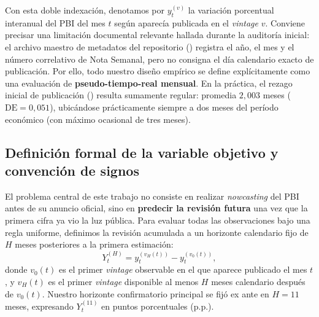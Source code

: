 \documentclass[12pt,letterpaper]{article}
\begin{document}
Con esta doble indexación, denotamos por \(y_t^{(v)}\) la variación porcentual interanual del PBI del mes \(t\) según aparecía publicada en el \emph{vintage} \(v\). Conviene precisar una limitación documental relevante hallada durante la auditoría inicial: el archivo maestro de metadatos del repositorio () registra el año, el mes y el número correlativo de Nota Semanal, pero no consigna el día calendario exacto de publicación. Por ello, todo nuestro diseño empírico se define explícitamente como una evaluación de \textbf{pseudo-tiempo-real mensual}. En la práctica, el rezago inicial de publicación () resulta sumamente regular: promedia \(2{,}003\) meses (\(\text{DE}=0{,}051\)), ubicándose prácticamente siempre a dos meses del período económico (con máximo ocasional de tres meses).

\subsection{Definición formal de la variable objetivo y convención de signos}

El problema central de este trabajo no consiste en realizar \emph{nowcasting} del PBI antes de su anuncio oficial, sino en \textbf{predecir la revisión futura} una vez que la primera cifra ya vio la luz pública. Para evaluar todas las observaciones bajo una regla uniforme, definimos la revisión acumulada a un horizonte calendario fijo de \(H\) meses posteriores a la primera estimación:
\begin{equation}
  Y_t^{(H)} = y_t^{(v_H(t))} - y_t^{(v_0(t))},
  \label{eq:revision_def}
\end{equation}
donde \(v_0(t)\) es el primer \emph{vintage} observable en el que aparece publicado el mes \(t\), y \(v_H(t)\) es el primer \emph{vintage} disponible al menos \(H\) meses calendario después de \(v_0(t)\). Nuestro horizonte confirmatorio principal se fijó ex ante en \(H = 11\) meses, expresando \(Y_t^{(11)}\) en puntos porcentuales (p.p.).

\end{document}
